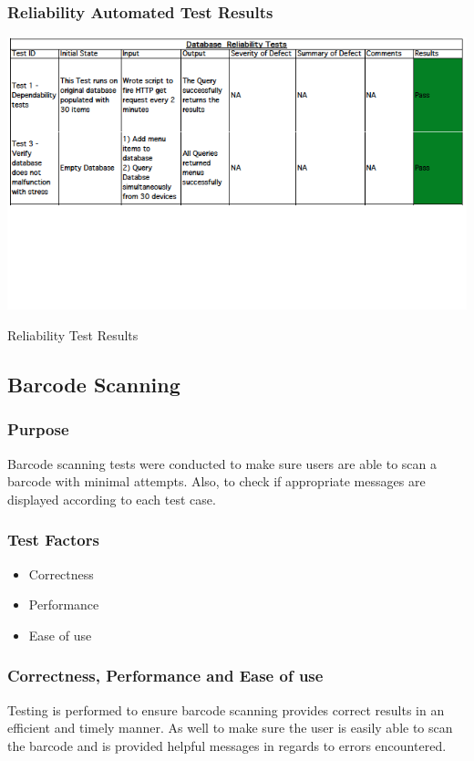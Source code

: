 \documentclass[12pt, titlepage]{article}
\begin{document}
\subsubsection{Reliability Automated Test Results }
\begin{table}[h]
\includegraphics[width=\textwidth,height=\textheight,keepaspectratio]{reliability_tests.png}
  \caption{Reliability Test Results}
\end{table}

\subsection{Barcode Scanning}

\subsubsection{Purpose}
Barcode scanning tests were conducted to make sure users are able to scan a barcode with minimal attempts. Also, to check if appropriate messages are displayed according to each test case.

\subsubsection{Test Factors}
\begin{itemize}
 \item Correctness
 \item Performance
 \item Ease of use
 \end{itemize}
 
\subsubsection{Correctness, Performance and Ease of use}
Testing is performed to ensure barcode scanning provides correct results in an efficient and timely manner. As well to make sure the
user is easily able to scan the barcode and is provided helpful messages in regards to errors encountered.
\end{document}

